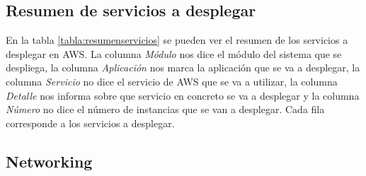\subsection{Resumen de servicios a desplegar}

\begin{table}[H]\label{tabla:resumenservicios}
	\centering
	\caption{Recursos de servicios a desplegar}
\end{table}

En la tabla \ref{tabla:resumenservicios} se pueden ver el resumen de los servicios a desplegar en AWS. La columna \textit{Módulo} nos dice el módulo del sistema que se despliega, la columna \textit{Aplicación} nos marca la aplicación que se va a desplegar, la columna \textit{Servicio} no dice el servicio de AWS que se va a utilizar, la columna \textit{Detalle} nos informa sobre que servicio en concreto se va a desplegar y la columna \textit{Número} no dice el número de instancias que se van a desplegar. Cada fila corresponde a los servicios a desplegar.

\subsection{Networking}


